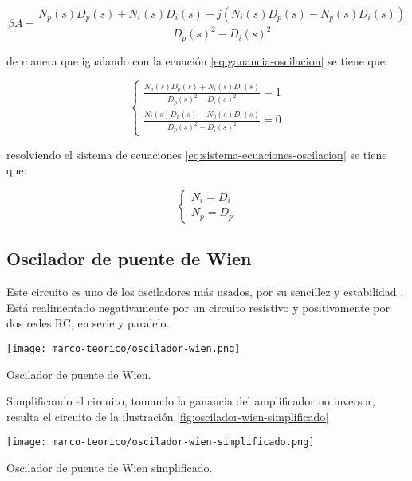 \begin{equation}
  \beta A = \frac{N_p(s)D_p(s) + N_i(s)D_i(s) + j(N_i(s)D_p(s) - N_p(s)D_i(s))}{D_p(s)^2 - D_i(s)^2}
  \label{eq:ganancia-lazo-final}
\end{equation}

de manera que igualando con la ecuación \ref{eq:ganancia-oscilacion} se tiene que:

\begin{equation}
  \begin{cases}
    \frac{N_p(s)D_p(s) + N_i(s)D_i(s)}{D_p(s)^2 - D_i(s)^2} = 1 \\
    \frac{N_i(s)D_p(s) - N_p(s)D_i(s)}{D_p(s)^2 - D_i(s)^2} = 0
  \end{cases}
  \label{eq:sistema-ecuaciones-oscilacion}
\end{equation}

resolviendo el sistema de ecuaciones \ref{eq:sistema-ecuaciones-oscilacion} se tiene que:

\begin{equation}
  \begin{cases}
    N_i = D_i \\
    N_p = D_p
  \end{cases}
\end{equation}

\subsection{Oscilador de puente de Wien}

Este circuito es uno de los osciladores más usados, por su sencillez y estabilidad \cite{herrera-osciladores}. Está realimentado negativamente por un circuito resistivo y positivamente por dos redes RC, en serie y paralelo.

\begin{ilustracion}[ht]
  \centering
  \texttt{[image: marco-teorico/oscilador-wien.png]}
  \caption{Oscilador de puente de Wien.}
  \label{fig:oscilador-wien}
\end{ilustracion}

Simplificando el circuito, tomando la ganancia del amplificador no inversor, resulta el circuito de la ilustración \ref{fig:oscilador-wien-simplificado}

\begin{ilustracion}[ht]
  \centering
  \texttt{[image: marco-teorico/oscilador-wien-simplificado.png]}
  \caption{Oscilador de puente de Wien simplificado.}
  \label{fig:oscilador-wien-simplificado}
\end{ilustracion}


